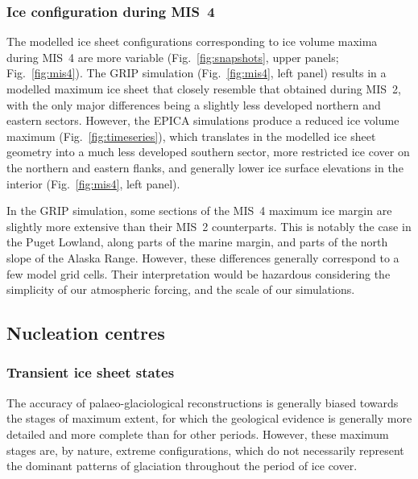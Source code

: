 \documentclass[tc, manuscript]{copernicus}
\begin{document}
\subsubsection{Ice configuration during MIS~4}
\label{sec:mis4}

The modelled ice sheet configurations corresponding to ice volume maxima during
MIS~4 are more variable (Fig.~\ref{fig:snapshots}, upper panels;
Fig.~\ref{fig:mis4}). The GRIP simulation (Fig.~\ref{fig:mis4}, left panel)
results in a modelled maximum ice sheet that closely resemble that obtained
during MIS~2, with the only major differences being a slightly less developed
northern and eastern sectors. However, the EPICA simulations produce a reduced
ice volume maximum (Fig.~\ref{fig:timeseries}), which translates in the
modelled ice sheet geometry into a much less developed southern sector, more
restricted ice cover on the northern and eastern flanks, and generally lower
ice surface elevations in the interior (Fig.~\ref{fig:mis4}, left panel).

In the GRIP simulation, some sections of the MIS~4 maximum ice margin are
slightly more extensive than their MIS~2 counterparts. This is notably the case
in the Puget Lowland, along parts of the marine margin, and parts of the north
slope of the Alaska Range. However, these differences generally correspond to a
few model grid cells. Their interpretation would be hazardous considering
the simplicity of our atmospheric forcing, and the scale of our simulations.


\subsection{Nucleation centres}

\subsubsection{Transient ice sheet states}

The accuracy of palaeo-glaciological reconstructions is generally biased
towards the stages of maximum extent, for which the geological evidence is
generally more detailed and more complete than for other periods. However,
these maximum stages are, by nature, extreme configurations, which do not
necessarily represent the dominant patterns of glaciation throughout the period
of ice cover.
\end{document}
